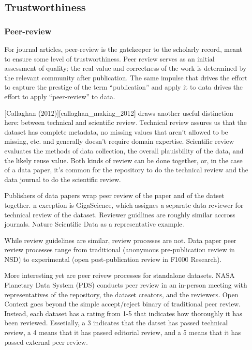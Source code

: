 \documentclass[10pt,a4paper,twocolumn]{article}
\begin{document}
\subsection*{Trustworthiness}\label{trustworthiness}

\subsubsection{Peer-review}\label{peer-review}

For journal articles, peer-review is the gatekeeper to the scholarly record, meant to ensure some level of trustworthiness. 
Peer review serves as an initial assessment of quality; the real value and correctness of the work is determined by the relevant community after publication. 
The same impulse that drives the effort to capture the prestige of the term ``publication'' and apply it to data drives the effort to apply ``peer-review'' to data.

{[}Callaghan (2012){]}{[}callaghan\_making\_2012{]} draws another useful distinction here: between technical and scientific review. 
Technical review assures us that the dataset has complete metadata, no missing values that aren't allowed to be missing, etc. and generally doesn't require domain expertise. 
Scientific review evaluates the methods of data collection, the overall plauisbility of the data, and the likely reuse value. 
Both kinds of review can be done together, or, in the case of a data paper, it's common for the repository to do the technical review and the data journal to do the scientific review.

Publishers of data papers wrap peer review of the paper and of the datset together. 
n exception is GigaScience, which assignes a separate data reviewer for technical review of the dataset. 
Reviewer guidlines are roughly similar accross journals. Nature Scientific Data as a representative example.

While review guidelines are similar, review processes are not. 
Data paper peer review processes range from traditional (anonymous pre-publication review in NSD) to experimental (open post-publication review in F1000 Research).

More interesting yet are peer reivew processes for standalone datasets. 
NASA Planetary Data System (PDS) conducts peer review in an in-person meeting with representatives of the repository, the dataset creators, and the reviewers. 
Open Context goes beyond the simple accept/reject binary of traditional peer review. 
Instead, each dataset has a rating from 1-5 that indicates how thoroughly it has been reviewed. 
Essetially, a 3 indicates that the datset has passed technical review, a 4 means that it has passed editorial review, and a 5 means that it has passed external peer review.
\end{document}
